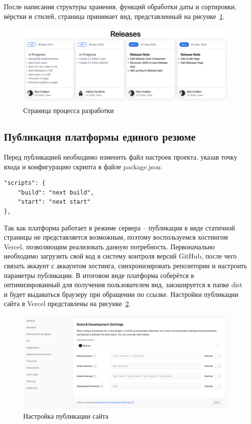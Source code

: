 \documentclass[master, och, diploma]{SCWorks}
\begin{document}
После написания структуры хранения, функций обработки даты и сортировки, вёрстки и стилей, страница принимает вид, представленный на рисунке~\ref{fig:33}.
\begin{figure}[!ht]
    \centering
    \includegraphics[width=12cm]{images/image-releases.png}
    \caption{\label{fig:33}%
        Страница процесса разработки}
\end{figure} 



\subsection{Публикация платформы единого резюме}
Перед публикацией необходимо изменить файл настроек проекта, указав точку входа и конфигурацию скрипта в файле package.json:
\begin{verbatim}
"scripts": {
    "build": "next build",
    "start": "next start"
},
\end{verbatim}

Так как платформа работает в режиме сервера – публикация в виде статичной страницы не представляется возможным, поэтому воспользуемся хостингом Vercel, позволяющим реализовать данную потребность. Первоначально необходимо загрузить свой код в систему контроля версий GitHub, после чего связать аккаунт с аккаунтом хостинга, синхронизировать репозитории и настроить параметры публикации. В итоговом виде платформа соберётся в оптимизированный для получения пользователем вид, закэшируется в папке dist и будет выдаваться браузеру при обращении по ссылке. Настройки публикации сайта в Vercel представлены на рисунке~\ref{fig:25}.
\begin{figure}[!ht]
    \centering
    \includegraphics[width=12cm]{images/image-vercel.png}
    \caption{\label{fig:25}%
        Настройка публикации сайта}
\end{figure} 
\end{document}
